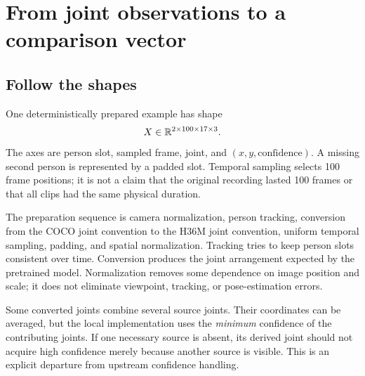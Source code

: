 \clearpage
\section{From joint observations to a comparison vector}\label{sec:representation}
\subsection{Follow the shapes}
One deterministically prepared example has shape
\[
 X\in\mathbb{R}^{2\times100\times17\times3}.
\]
The axes are person slot, sampled frame, joint, and $(x,y,\text{confidence})$.
A missing second person is represented by a padded slot. Temporal sampling
selects 100 frame positions; it is not a claim that the original recording
lasted 100 frames or that all clips had the same physical duration.

The preparation sequence is camera normalization, person tracking, conversion
from the COCO joint convention to the H36M joint convention, uniform temporal
sampling, padding, and spatial normalization. Tracking tries to keep person
slots consistent over time. Conversion produces the joint arrangement expected
by the pretrained model. Normalization removes some dependence on image position
and scale; it does not eliminate viewpoint, tracking, or pose-estimation errors.

Some converted joints combine several source joints. Their coordinates can be
averaged, but the local implementation uses the \emph{minimum} confidence of
the contributing joints. If one necessary source is absent, its derived joint
should not acquire high confidence merely because another source is visible.
This is an explicit departure from upstream confidence handling.

\begin{center}
\end{center}

